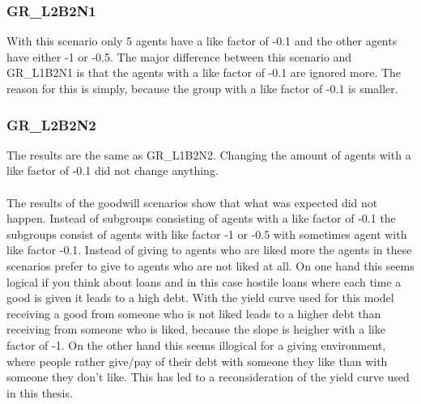 \documentclass[twoside,openright]{uva-bachelor-thesis}
\begin{document}
\clearpage
\subsubsection{GR\_L2B2N1}
With this scenario only 5 agents have a like factor of -0.1 and the other agents have either -1 or -0.5. The major difference between this scenario and GR\_L1B2N1 is that the agents with a like factor of -0.1 are ignored more. The reason for this is simply, because the group with a like factor of -0.1 is smaller.
\subsubsection{GR\_L2B2N2}
The results are the same as GR\_L1B2N2. Changing the amount of agents with a like factor of -0.1 did not change anything.
\\
\\
The results of the goodwill scenarios show that what was expected did not happen. Instead of subgroups consisting of agents with a like factor of -0.1 the subgroups consist of agents with like factor -1 or -0.5 with sometimes agent with like factor -0.1. Instead of giving to agents who are liked more the agents in these scenarios prefer to give to agents who are not liked at all. On one hand this seems logical if you think about loans and in this case hostile loans where each time a good is given it leads to a high debt. With the yield curve used for this model receiving a good from someone who is not liked leads to a higher debt than receiving from someone who is liked, because the slope is heigher with a like factor of -1. On the other hand this seems illogical for a giving environment, where people rather give/pay of their debt with someone they like than with someone they don't like. This has led to a reconsideration of the yield curve used in this thesis.
\end{document}
